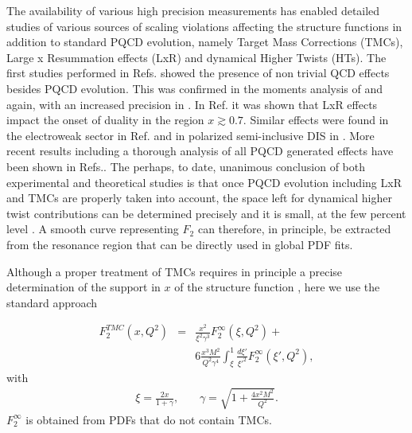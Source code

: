 \documentclass[
twocolumn,
aps,prd,
nofootinbib,
superscriptaddress,
showpacs,ligh
tightenlines, 
]{revtex4}
\begin{document}
%
The availability of various high precision measurements \cite{Niculescu:2000tk,Malace:2009kw,Malace:2009dg,Malace:2011ad,Baillie:2011za,Tkachenko:2014byy,Tvaskis:2016uxm} has enabled detailed studies of various sources of scaling violations affecting the structure functions in addition to standard PQCD evolution, namely Target Mass Corrections (TMCs), Large x Resummation effects (LxR) and dynamical Higher Twists (HTs).
The first studies performed in Refs.\cite{Liuti:2001qk} showed the presence of non trivial QCD effects besides PQCD evolution. This was confirmed in the moments analysis of \cite{Liuti:2001qk,Ricco:1998yr,Armstrong:2001xj,Osipenko:2003bu} and again, with an increased precision in  \cite{Niculescu:2005rh,Monaghan:2012et,Psaker:2008ju,Accardi:2009br}. In Ref.\cite{Bianchi:2003hi} it was shown that LxR effects impact the onset of duality in the region $x \gtrsim 0.7$. Similar effects were found in the electroweak sector in Ref.\cite{Corcella:2005us} and in polarized semi-inclusive DIS in \cite{Anderle:2013lka}. More recent results including a thorough analysis of all PQCD generated effects have been shown in Refs.\cite{Accardi:2016qay}. The perhaps, to date, unanimous conclusion of both experimental and theoretical studies is that once PQCD evolution including LxR and TMCs are properly taken into account,  the space left for dynamical higher twist contributions can be determined precisely and it is small, at the few percent level \cite{Psaker:2008ju}. 
%
A smooth curve representing $F_2$ can therefore, in principle, be extracted from the resonance region that can be directly used in global PDF fits. 

Although a proper treatment of TMCs requires in principle a precise determination of the support in $x$ of the structure function \cite{Accardi:2008ne}, here we use the standard approach

\begin{eqnarray}
\label{TMC}
F_{2}^{TMC}(x,Q^2) & = &
    \frac{x^2}{\xi^2\gamma^3}F_2^{\mathrm{\infty}}(\xi,Q^2) + \\ & &
    6\frac{x^3M^2}{Q^2\gamma^4}\int_\xi^1\frac{d \xi'}{{\xi'}^2} \nonumber
F_2^{\mathrm{\infty}}(\xi',Q^2),
\end{eqnarray}
with
\begin{eqnarray}
\xi = \frac{2x}{1 + \gamma}, \quad \;\;\; \gamma = \sqrt{1 + \frac{4 x^{2} M^{2}}{Q^{2}}} .
\end{eqnarray}
$F_2^{\infty}$ is obtained from PDFs that do not contain TMCs.
\end{document}
